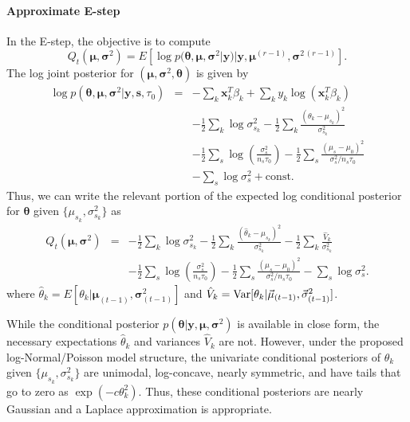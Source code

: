 \paragraph{Approximate E-step}
%
In the E-step, the objective is to compute 
\begin{equation} 
  Q_t(\bm \mu, \bm \sigma^2) = E \left[ \log p(\bm \theta, \bm \mu, \bm \sigma^2 | \bm y ) | \bm y, \bm \mu^{(r-1)}, \bm \sigma^{2\,(r-1)} \right].
\end{equation}
%
The log joint posterior for $(\bm \mu, \bm \sigma^2, \bm \theta)$ is given by
\begin{eqnarray}\label{eq:logPosterior}
 \log p(\bm \theta, \bm \mu, \bm \sigma^2 | \bm y, \bm s, \tau_0) &=& -\sum_k
\bm x_k^T \beta_k + \sum_k y_k \log \left( \bm x_k^T \beta_k \right)  \\
 \nonumber && - \frac{1}{2} \sum_k \log \sigma^2_{s_k} -
  \frac{1}{2} \sum_k \frac{(\theta_k - \mu_{s_k})^2}{\sigma^2_{s_k}} \\
 \nonumber && - \frac{1}{2} \sum_s \log \left( \frac{\sigma^2_{s}}{n_{s} \tau_0}
  \right) - \frac{1}{2} \sum_s \frac{(\mu_s - \mu_0)^2}{\sigma^2_{s} / n_{s} \tau_0} \\
  \nonumber && - \sum_s \log \sigma^2_s + \mathrm{const}.
\end{eqnarray}
%
Thus, we can write the relevant portion of the expected log conditional
posterior for $\bm \theta$ given $\{\mu_{s_k}, \sigma^2_{s_k}\}$ as
\begin{eqnarray}
 Q_t(\bm \mu, \bm \sigma^2) &=& - \frac{1}{2} \sum_k \log \sigma^2_{s_k} -
  \frac{1}{2} \sum_k \frac{(\hat{\theta}_k - \mu_{s_k})^2}{\sigma^2_{s_k}}
 - \frac{1}{2} \sum_k \frac{\hat{V}_k}{\sigma^2_{s_k}} \\
 \nonumber && - \frac{1}{2} \sum_s \log \left( \frac{\sigma^2_{s}}{n_{s} \tau_0}
  \right) - \frac{1}{2} \sum_s \frac{(\mu_s - \mu_0)^2}{\sigma^2_{s} / n_{s} \tau_0}
 - \sum_s \log \sigma^2_s.
\end{eqnarray}
where $\hat{\theta}_k = E[ \theta_k | \bm \mu_{(t-1)}, \bm \sigma^2_{(t-1)} ]$
and $\hat{V}_k = \operatorname{Var} [ \theta_k | \vec \mu_{(t-1)}, \vec \sigma^2_{(t-1)} ]$. 

While the conditional posterior $p(\bm \theta | \bm y, \bm \mu, \bm \sigma^2 )$ is available in close form,  the necessary  expectations $\hat{\theta}_k$ and variances $\hat V_k$ are not.
However, under the proposed log-Normal/Poisson model structure, the univariate conditional posteriors of $\theta_k$ given $\{\mu_{s_k}, \sigma^2_{s_k}\}$ are unimodal, log-concave, nearly symmetric, and have tails that go to zero as $\exp(-c \theta_k^2)$. 
Thus, these conditional posteriors are nearly Gaussian and a Laplace approximation is appropriate. 


